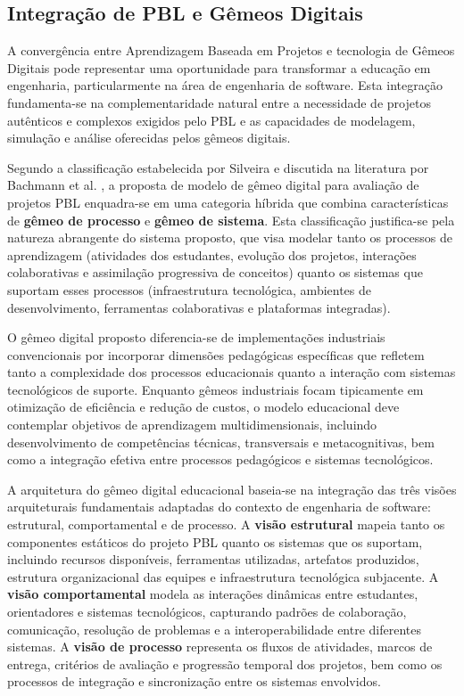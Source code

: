 \documentclass[12pt,a4paper]{article}
\renewcommand{\cite}[1]{}
\begin{document}
\subsection{Integração de PBL e Gêmeos Digitais}

A convergência entre Aprendizagem Baseada em Projetos e tecnologia de Gêmeos
Digitais pode representar uma oportunidade para transformar a educação em
engenharia, particularmente na área de engenharia de software. Esta integração
fundamenta-se na complementaridade natural entre a necessidade de projetos
autênticos e complexos exigidos pelo PBL e as capacidades de modelagem,
simulação e análise oferecidas pelos gêmeos digitais.

Segundo a classificação estabelecida por Silveira \cite{silveira2024panorama} e
discutida na literatura por Bachmann et al. \cite{bachmann2023}, a proposta de
modelo de gêmeo digital para avaliação de projetos PBL enquadra-se em uma
categoria híbrida que combina características de \textbf{gêmeo de processo} e
\textbf{gêmeo de sistema}. Esta classificação justifica-se pela natureza
abrangente do sistema proposto, que visa modelar tanto os processos de
aprendizagem (atividades dos estudantes, evolução dos projetos, interações
colaborativas e assimilação progressiva de conceitos) quanto os sistemas que
suportam esses processos (infraestrutura tecnológica, ambientes de
desenvolvimento, ferramentas colaborativas e plataformas integradas).

O gêmeo digital proposto diferencia-se de
implementações industriais convencionais por incorporar dimensões pedagógicas
específicas que refletem tanto a complexidade dos processos educacionais quanto
a interação com sistemas tecnológicos de suporte. Enquanto gêmeos industriais
focam tipicamente em otimização de eficiência e redução de custos, o modelo
educacional deve contemplar objetivos de aprendizagem multidimensionais,
incluindo desenvolvimento de competências técnicas, transversais e
metacognitivas, bem como a integração efetiva entre processos pedagógicos e
sistemas tecnológicos.

A arquitetura do gêmeo digital educacional baseia-se na integração das três
visões arquiteturais fundamentais adaptadas do contexto de engenharia de
software: estrutural, comportamental e de processo. A \textbf{visão estrutural}
mapeia tanto os componentes estáticos do projeto PBL quanto os sistemas que os
suportam, incluindo recursos disponíveis, ferramentas utilizadas, artefatos
produzidos, estrutura organizacional das equipes e infraestrutura tecnológica
subjacente. A \textbf{visão comportamental} modela as interações dinâmicas
entre estudantes, orientadores e sistemas tecnológicos, capturando padrões de
colaboração, comunicação, resolução de problemas e a interoperabilidade entre
diferentes sistemas. A \textbf{visão de processo} representa os fluxos de
atividades, marcos de entrega, critérios de avaliação e progressão temporal dos
projetos, bem como os processos de integração e sincronização entre os sistemas
envolvidos.
\end{document}
